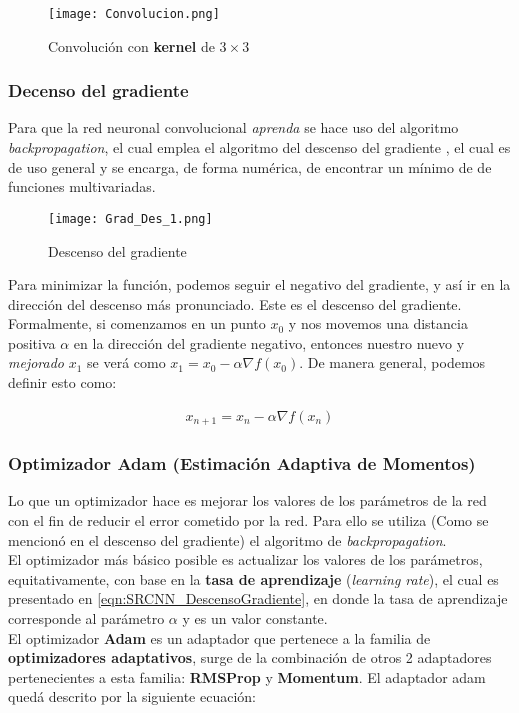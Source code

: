 \begin{figure}[H]
    \label{fig:SRCNN_Convolucion}
    \centering
    \texttt{[image: Convolucion.png]}
    \caption{Convolución con \textbf{kernel} de $3\times 3$}
\end{figure}

\subsubsection{Decenso del gradiente}
Para que la red neuronal convolucional \emph{aprenda} se hace uso del algoritmo \emph{backpropagation}, el cual emplea el
algoritmo del descenso del gradiente \cite{DescensoGradiente}, el cual es de uso general y se encarga, de forma numérica, de encontrar un mínimo de
de funciones multivariadas.\\

\begin{figure}[H]
    \label{fig:SRCNN_GradDescent}
    \centering
    \texttt{[image: Grad\_Des\_1.png]}
    \caption{Descenso del gradiente}
\end{figure}

Para minimizar la función, podemos seguir el negativo del gradiente, y así ir en la dirección del descenso más pronunciado.
Este es el descenso del gradiente. Formalmente, si comenzamos en un punto $x_0$ y nos movemos una distancia positiva $\alpha$
en la dirección del gradiente negativo, entonces nuestro nuevo y \emph{mejorado} $x_1$ se verá como $x_1=x_0-\alpha\nabla f(x_0)$.
De manera general, podemos definir esto como:

\begin{align}
    \label{eqn:SRCNN_DescensoGradiente}
    x_{n+1}=x_n-\alpha\nabla f(x_n)
\end{align}

\subsubsection{Optimizador Adam (Estimación Adaptiva de Momentos)}
Lo que un optimizador \cite{AdamOptimizador} hace es mejorar los valores de los parámetros de la red con el fin de reducir el error
cometido por la red.
Para ello se utiliza (Como se mencionó en el descenso del gradiente) el algoritmo de \emph{backpropagation}.\\
El optimizador más básico posible es actualizar los valores de los parámetros, equitativamente, con base en la \textbf{tasa de
aprendizaje} (\emph{learning rate}), el cual es presentado en \eqref{eqn:SRCNN_DescensoGradiente}, en donde la tasa de aprendizaje
corresponde al parámetro \textbf{$\alpha$} y es un valor constante.\\
El optimizador \textbf{Adam} es un adaptador que pertenece a la familia de \textbf{optimizadores adaptativos}, surge de la
combinación de otros 2 adaptadores pertenecientes a esta familia: \textbf{RMSProp} y \textbf{Momentum}.
El adaptador adam quedá descrito por la siguiente ecuación:

